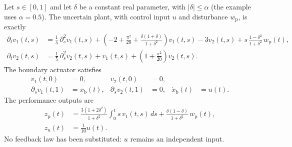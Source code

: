 
Let $s\in[0,1]$ and let $\delta$ be a constant real parameter, with
$|\delta|\leq\alpha$ (the example uses $\alpha=0.5$).
The uncertain plant, with control input $u$ and disturbance $w_{\mathrm p}$,
is exactly
\begin{align*}
 \partial_t v_1(t,s)
 &=\frac15\,\partial_s^2v_1(t,s)
   +\left(-2+\frac{\pi^2}{20}
              +\frac{\delta(1+\delta)}{1+\delta^2}\right)v_1(t,s)
   -3v_2(t,s)
   +s\,\frac{1-\delta^2}{1+\delta^2}\,w_{\mathrm p}(t),\\
 \partial_t v_2(t,s)
 &=\frac15\,\partial_s^2v_2(t,s)
   +v_1(t,s)+\left(1+\frac{\pi^2}{20}\right)v_2(t,s).
\end{align*}
The boundary actuator satisfies
\begin{align*}
 v_1(t,0)&=0,&v_2(t,0)&=0,\\
 \partial_s v_1(t,1)&=x_{\mathrm b}(t),&
 \partial_s v_2(t,1)&=0,&
 \dot x_{\mathrm b}(t)&=u(t).
\end{align*}
The performance outputs are
\begin{align*}
 z_{\mathrm p}(t)
 &=\frac{3(1+2\delta^2)}{1+\delta^2}
      \int_0^1s\,v_1(t,s)\,ds
   +\frac{\delta(1-\delta)}{1+\delta^2}\,w_{\mathrm p}(t),\\
 z_u(t)&=\frac1{10}u(t).
\end{align*}
No feedback law has been substituted: $u$ remains an independent input.

